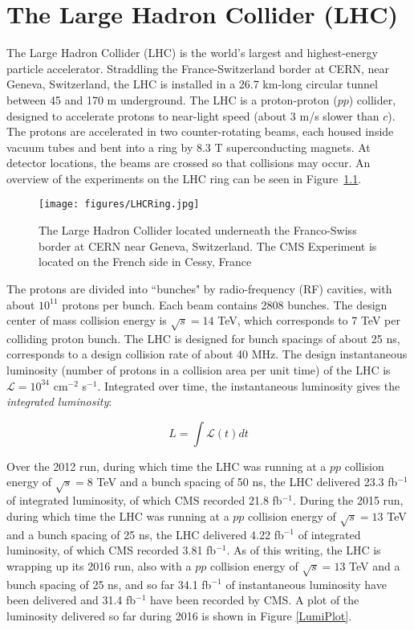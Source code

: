 \chapter{The Large Hadron Collider (LHC)}

The Large Hadron Collider (LHC) is the world's largest and highest-energy particle accelerator. Straddling the France-Switzerland border at CERN, near Geneva, Switzerland, the LHC is installed in a 26.7 km-long circular tunnel between 45 and 170 m underground. The LHC is a proton-proton ($pp$) collider, designed to accelerate protons to near-light speed (about 3 m/s slower than $c$). The protons are accelerated in two counter-rotating beams, each housed inside vacuum tubes and bent into a ring by 8.3 T superconducting magnets. At detector locations, the beams are crossed so that collisions may occur. An overview of the experiments on the LHC ring can be seen in Figure~\ref{fig:LHCRing}. 

\begin{figure}\centering
  \texttt{[image: figures/LHCRing.jpg]}
  \caption{\label{fig:LHCRing} The Large Hadron Collider located underneath the Franco-Swiss border at CERN near Geneva, Switzerland. The CMS Experiment is located on the French side in Cessy, France}
\end{figure}

The protons are divided into ``bunches" by radio-frequency (RF) cavities, with about $10^{11}$ protons per bunch. Each beam contains 2808 bunches. The design center of mass collision energy is $\sqrt{s} = 14$ TeV, which corresponds to 7 TeV per colliding proton bunch. The LHC is designed for bunch spacings of about 25 ns, corresponds to a design collision rate of about 40 MHz. The design instantaneous luminosity (number of protons in a collision area per unit time) of the LHC is $\mathcal{L} = 10^{34}$ cm$^{-2}$ s$^{-1}$. Integrated over time, the instantaneous luminosity gives the \textit{integrated luminosity}:

\begin{equation}
L = \int\mathcal{L}(t)dt
\end{equation}

Over the 2012 run, during which time the LHC was running at a $pp$ collision energy of $\sqrt{s} = 8$ TeV and a bunch spacing of 50 ns, the LHC delivered 23.3 fb$^{-1}$ of integrated luminosity, of which CMS recorded 21.8 fb$^{-1}$. During the 2015 run, during which time the LHC was running at a $pp$ collision energy of $\sqrt{s} = 13$ TeV and a bunch spacing of 25 ns, the LHC delivered 4.22 fb$^{-1}$ of integrated luminosity, of which CMS recorded 3.81 fb$^{-1}$. As of this writing, the LHC is wrapping up its 2016 run, also with a $pp$ collision energy of $\sqrt{s} = 13$ TeV and a bunch spacing of 25 ns, and so far 34.1 fb$^{-1}$ of instantaneous luminosity have been delivered and 31.4 fb$^{-1}$ have been recorded by CMS. A plot of the luminosity delivered so far during 2016 is shown in Figure \ref{LumiPlot}.

